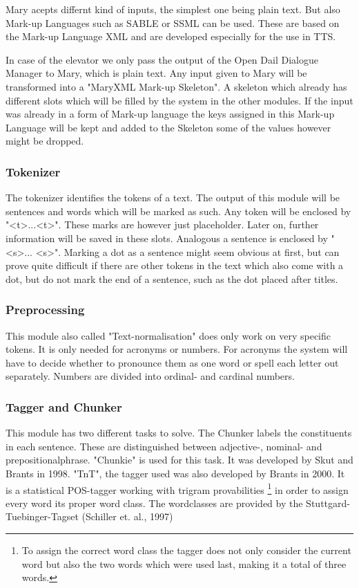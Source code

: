 \documentclass[a4paper, 12pt]{article}
\begin{document}
Mary acepts differnt kind of inputs, the simplest one being plain text. 
But also Mark-up Languages such as SABLE or SSML can be used. 
These are based on the Mark-up Language XML and are developed especially for the use in TTS.

In case of the elevator we only pass the output of the Open Dail Dialogue Manager to Mary, which is plain text.
Any input given to Mary will be transformed into a "MaryXML Mark-up Skeleton". 
A skeleton which already has different slots which will be filled by the system in the other modules.
If the input was already in a form of Mark-up language the keys assigned in this Mark-up Language will be kept and added to the Skeleton some of the values however might be dropped.

\subsubsection* {Tokenizer}

The tokenizer identifies the tokens of a text. The output of this module will be sentences and words which will be marked as such.
Any token will be enclosed by "\textless t\textgreater ...\textless  t\textgreater". 
These marks are however just placeholder. 
Later on, further information will be saved in these slots.
Analogous a sentence is enclosed by "\textless s\textgreater ... \textless s\textgreater". 
Marking a dot as a sentence might seem obvious at first, but can prove quite difficult if there are other tokens in the text which also come with a dot, but do not mark the end of a sentence, such as the dot placed after titles.

\subsubsection* {Preprocessing}

This module also called "Text-normalisation" does only work on very specific tokens.
It is only needed for acronyms or numbers.
For acronyms the system will have to decide whether to pronounce them as one word or spell each letter out separately.
Numbers are divided into ordinal- and cardinal numbers.

\subsubsection* {Tagger and Chunker}

This module has two different tasks to solve. 
The Chunker labels the constituents in each sentence.
These are distinguished between adjective-, nominal- and prepositionalphrase. "Chunkie" is used for this task. 
It was developed by Skut and Brants in 1998. 
"TnT", the tagger used was also developed by Brants in 2000. 
It is a statistical POS-tagger working with trigram provabilities \footnote {To assign the correct word class the tagger does not only consider the current word but also the two words which were used last, making it a total of three words.} in order to assign every word its proper word class.
The wordclasses are provided by the Stuttgard-Tuebinger-Tagset (Schiller et. al., 1997)
\end{document}

